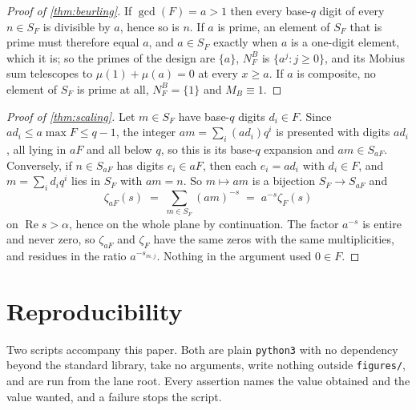 \documentclass[11pt]{amsart}
\theoremstyle{definition}
\theoremstyle{remark}
\begin{document}
\begin{proof}[Proof of \cref{thm:beurling}]
If $\gcd(F) = a > 1$ then every base-$q$ digit of every $n \in S_{F}$ is divisible by $a$, hence so is $n$. If $a$ is prime, an element of $S_{F}$ that is prime must therefore equal $a$, and $a \in S_{F}$ exactly when $a$ is a one-digit element, which it is; so the primes of the design are $\{a\}$, $N_{F}^{B}$ is $\{a^{j} : j \ge 0\}$, and its Mobius sum telescopes to $\mu(1) + \mu(a) = 0$ at every $x \ge a$. If $a$ is composite, no element of $S_{F}$ is prime at all, $N_{F}^{B} = \{1\}$ and $M_{B} \equiv 1$.
\end{proof}

\begin{proof}[Proof of \cref{thm:scaling}]
Let $m \in S_{F}$ have base-$q$ digits $d_{i} \in F$. Since $a d_{i} \le a \max F \le q-1$, the integer $am = \sum_{i} (a d_{i}) q^{i}$ is presented with digits $ad_{i}$, all lying in $aF$ and all below $q$, so this is its base-$q$ expansion and $am \in S_{aF}$. Conversely, if $n \in S_{aF}$ has digits $e_{i} \in aF$, then each $e_{i} = a d_{i}$ with $d_{i} \in F$, and $m = \sum_{i} d_{i}q^{i}$ lies in $S_{F}$ with $am = n$. So $m \mapsto am$ is a bijection $S_{F} \to S_{aF}$ and
\[
  \zeta_{aF}(s) \;=\; \sum_{m \in S_{F}} (am)^{-s} \;=\; a^{-s}\zeta_{F}(s)
\]
on $\operatorname{Re} s > \alpha$, hence on the whole plane by continuation. The factor $a^{-s}$ is entire and never zero, so $\zeta_{aF}$ and $\zeta_{F}$ have the same zeros with the same multiplicities, and residues in the ratio $a^{-s_{m,j}}$. Nothing in the argument used $0 \in F$.
\end{proof}

\section{Reproducibility}
\label{sec:repro}

Two scripts accompany this paper. Both are plain \texttt{python3} with no dependency beyond the standard library, take no arguments, write nothing outside \texttt{figures/}, and are run from the lane root. Every assertion names the value obtained and the value wanted, and a failure stops the script.
\end{document}
